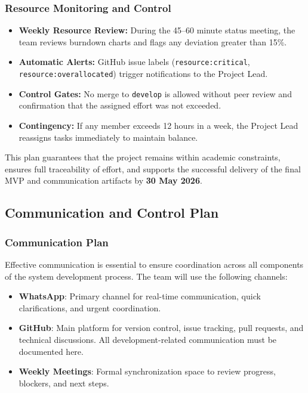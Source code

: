\documentclass[9pt,conference]{IEEEtran}
\begin{document}
\subsubsection{Resource Monitoring and Control}

\begin{itemize}
    \item \textbf{Weekly Resource Review:} During the 45–60 minute status meeting, the team reviews burndown charts and flags any deviation greater than 15\%.
    \item \textbf{Automatic Alerts:} GitHub issue labels (\texttt{resource:critical}, \texttt{resource:overallocated}) trigger notifications to the Project Lead.
    \item \textbf{Control Gates:} No merge to \texttt{develop} is allowed without peer review and confirmation that the assigned effort was not exceeded.
    \item \textbf{Contingency:} If any member exceeds 12 hours in a week, the Project Lead reassigns tasks immediately to maintain balance.
\end{itemize}

This plan guarantees that the project remains within academic constraints, ensures full traceability of effort, and supports the successful delivery of the final MVP and communication artifacts by \textbf{30 May 2026}.


\subsection{Communication and Control Plan}

\subsubsection{Communication Plan}

Effective communication is essential to ensure coordination across all components of the system development process. The team will use the following channels:
\begin{itemize}
    \item \textbf{WhatsApp}: Primary channel for real-time communication, quick clarifications, and urgent coordination.
    \item \textbf{GitHub}: Main platform for version control, issue tracking, pull requests, and technical discussions. All development-related communication must be documented here.
    \item \textbf{Weekly Meetings}: Formal synchronization space to review progress, blockers, and next steps.
\end{itemize}
\end{document}
